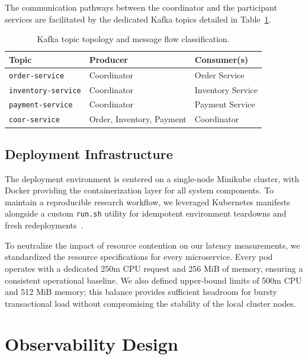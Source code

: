 \documentclass[]{USG}
\begin{document}
The communication pathways between the coordinator and the participant services are facilitated by the dedicated Kafka topics detailed in Table~\ref{tab:kafka-topics}.

\begin{table}[htbp]
  \caption{Kafka topic topology and message flow classification.}
  \label{tab:kafka-topics}
  \centering
  \begin{tabular}{lll}
    \toprule
    \textbf{Topic} & \textbf{Producer} & \textbf{Consumer(s)} \\
    \midrule
    \texttt{order-service}      & Coordinator & Order Service \\
    \texttt{inventory-service}  & Coordinator & Inventory Service \\
    \texttt{payment-service}    & Coordinator & Payment Service \\
    \texttt{coor-service}       & Order, Inventory, Payment & Coordinator \\
    \bottomrule
  \end{tabular}
\end{table}

\subsection{Deployment Infrastructure}
\label{subsec:deployment}

The deployment environment is centered on a single-node Minikube cluster, with Docker providing the containerization layer for all system components. To maintain a reproducible research workflow, we leveraged Kubernetes manifests alongside a custom \texttt{run.sh} utility for idempotent environment teardowns and fresh redeployments~\cite{burns2022kubernetes}. 

To neutralize the impact of resource contention on our latency measurements, we standardized the resource specifications for every microservice. Every pod operates with a dedicated 250m CPU request and 256 MiB of memory, ensuring a consistent operational baseline. We also defined upper-bound limits of 500m CPU and 512 MiB memory; this balance provides sufficient headroom for bursty transactional load without compromising the stability of the local cluster nodes.

\section{Observability Design}
\label{sec:observability}
\end{document}
